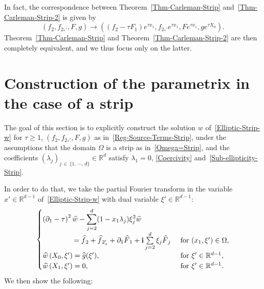 \documentclass[AHL,Unicode,longabstracts]{cedram}
\newcommand*\R{\mathbb{R}}
\renewcommand{\i}{\mathbf{i}}
\newcommand*\ds{\displaystyle}
\renewcommand{\geq}{\geqslant}
\renewcommand{\hat}{\widehat}
\let\oldhat\hat
\renewcommand*{\hat}[1]{\mathchoice{\widehat{#1}}{\widehat{#1}}{\oldhat{#1}}{\oldhat{#1}}}
\begin{document}
In fact, the correspondence between Theorem~\ref{Thm-Carleman-Strip} and~\ref{Thm-Carleman-Strip-2} is given by
\[
(f_2, f_{2_*'},F,g)
\to
\left((f_2 - \tau F_1) e^{\tau x_1}, f_{2_*'} e^{\tau x_1}, F e^{\tau x_1}, g e^{\tau X_0}
\right).
\]
Theorem~\ref{Thm-Carleman-Strip} and Theorem~\ref{Thm-Carleman-Strip-2} are then completely equivalent, and we thus focus only on the latter.

\section{Construction of the parametrix in the case of a strip}\label{Sec-parametrix-Strip}

The goal of this section is to explicitly construct the solution $w$ of~\eqref{Elliptic-Strip-w} for $\tau \geq 1$, $(f_2, f_{2_*'},F,g)$ as in~\eqref{Reg-Source-Terms-Strip}, under the assumptions that the domain $\Omega$ is a strip as in~\eqref{Omega=Strip}, and the coefficients $(\lambda_j)_{j\, \in\, \{1,\,\cdots,\,d\}} \in \R^d$ satisfy $\lambda_1 = 0$, \eqref{Coercivity} and~\eqref{Sub-ellipticity-Strip}.

In order to do that, we take the partial Fourier transform in the variable $x' \in \R^{d-1}$ of~\eqref{Elliptic-Strip-w} with dual variable $\xi' \in \R^{d-1}$:
\begin{equation}\label{Elliptic-Strip-w-Fourier}
\begin{cases}
\ds \left(\partial_1 - \tau\right)^2 \hat w- \sum_{j=2}^{d} (1 - x_{1}\lambda_j) \xi_j^{2} \hat w 
\\
\mkern78mu= \hat f_2 + \hat f_{2_*'} + \partial_1 \hat F_1 + \i \sum\limits_{j = 2}^d \xi_j \hat F_j & \text { for } (x_1, \xi') \in \Omega,\\
\hat w\left(X_{0}, \xi'\right)=\hat g (\xi '), &\text{ for } \xi' \in \R^{d-1},
\\
\hat w\left(X_{1}, \xi'\right)= 0, &\text{ for } \xi' \in \R^{d-1}.
\end{cases}
\end{equation}
We then show the following:
\end{document}
